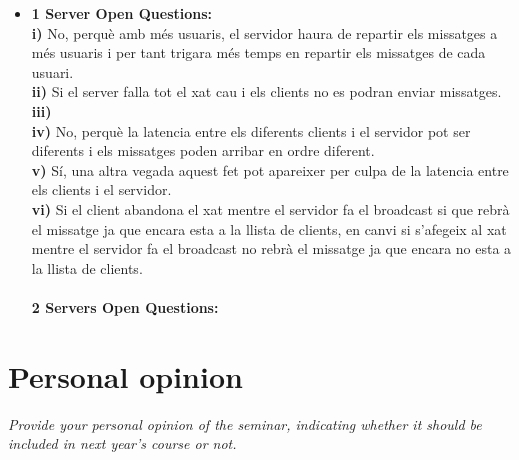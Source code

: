 \documentclass[a4paper, 10pt]{article}
\begin{document}
\begin{itemize}



\item{\textbf{1 Server Open Questions:}\\
\textbf{i) }No, perquè amb més usuaris, el servidor haura de repartir els missatges a més usuaris i per tant trigara més temps en repartir els missatges de cada usuari.\\
\textbf{ii)} Si el server falla tot el xat cau i els clients no es podran enviar missatges.\\
\textbf{iii)\\} 
\textbf{iv)} No, perquè la latencia entre els diferents clients i el servidor pot ser diferents i els missatges poden arribar en ordre diferent.\\
\textbf{v)} Sí, una altra vegada aquest fet pot apareixer per culpa de la latencia entre els clients i el servidor.\\
\textbf{vi)} Si el client abandona el xat mentre el servidor fa el broadcast si que rebrà el missatge ja que encara esta a la llista de clients, en canvi si s'afegeix al xat mentre el servidor fa el broadcast no rebrà el missatge ja que encara no esta a la  llista de clients.\\
\\
\textbf{2 Servers Open Questions:}\\}

\end{itemize}

\section{Personal opinion}

\textit{Provide your personal opinion of the seminar, indicating whether it should be included in next year's course or not.}
\end{document}
